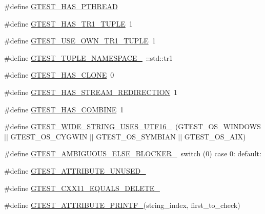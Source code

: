 \begin{DoxyCompactItemize}
\item 
\#define \mbox{\hyperlink{gtest-port_8h_a3341397e1952de0b9cd88762d4d3ae4b}{G\+T\+E\+S\+T\+\_\+\+H\+A\+S\+\_\+\+P\+T\+H\+R\+E\+AD}}
\item 
\#define \mbox{\hyperlink{gtest-port_8h_a6de49dd4cbae1db15dc6edca3b179d1b}{G\+T\+E\+S\+T\+\_\+\+H\+A\+S\+\_\+\+T\+R1\+\_\+\+T\+U\+P\+LE}}~1
\item 
\#define \mbox{\hyperlink{gtest-port_8h_afa144e5f5d039db0df873e7ad48c1fda}{G\+T\+E\+S\+T\+\_\+\+U\+S\+E\+\_\+\+O\+W\+N\+\_\+\+T\+R1\+\_\+\+T\+U\+P\+LE}}~1
\item 
\#define \mbox{\hyperlink{gtest-port_8h_a2023f59bfbd8fb7148262a63bdbf0b01}{G\+T\+E\+S\+T\+\_\+\+T\+U\+P\+L\+E\+\_\+\+N\+A\+M\+E\+S\+P\+A\+C\+E\+\_\+}}~\+::std\+::tr1
\item 
\#define \mbox{\hyperlink{gtest-port_8h_a40c075a7f969a694e59532356be59fd5}{G\+T\+E\+S\+T\+\_\+\+H\+A\+S\+\_\+\+C\+L\+O\+NE}}~0
\item 
\#define \mbox{\hyperlink{gtest-port_8h_add695166eb7b691f93777525d5881062}{G\+T\+E\+S\+T\+\_\+\+H\+A\+S\+\_\+\+S\+T\+R\+E\+A\+M\+\_\+\+R\+E\+D\+I\+R\+E\+C\+T\+I\+ON}}~1
\item 
\#define \mbox{\hyperlink{gtest-port_8h_a91a068d3bf6855b6f399f01836ae1482}{G\+T\+E\+S\+T\+\_\+\+H\+A\+S\+\_\+\+C\+O\+M\+B\+I\+NE}}~1
\item 
\#define \mbox{\hyperlink{gtest-port_8h_a0e3904ca8d62334ab5f29c057dceb6a1}{G\+T\+E\+S\+T\+\_\+\+W\+I\+D\+E\+\_\+\+S\+T\+R\+I\+N\+G\+\_\+\+U\+S\+E\+S\+\_\+\+U\+T\+F16\+\_\+}}~(G\+T\+E\+S\+T\+\_\+\+O\+S\+\_\+\+W\+I\+N\+D\+O\+WS $\vert$$\vert$ G\+T\+E\+S\+T\+\_\+\+O\+S\+\_\+\+C\+Y\+G\+W\+IN $\vert$$\vert$ G\+T\+E\+S\+T\+\_\+\+O\+S\+\_\+\+S\+Y\+M\+B\+I\+AN $\vert$$\vert$ G\+T\+E\+S\+T\+\_\+\+O\+S\+\_\+\+A\+IX)
\item 
\#define \mbox{\hyperlink{gtest-port_8h_a00b3684a621ce1422b55a0e7e8a6aecb}{G\+T\+E\+S\+T\+\_\+\+A\+M\+B\+I\+G\+U\+O\+U\+S\+\_\+\+E\+L\+S\+E\+\_\+\+B\+L\+O\+C\+K\+E\+R\+\_\+}}~switch (0) case 0\+: default\+:
\item 
\#define \mbox{\hyperlink{gtest-port_8h_a01f3b31960fc7c4c7ee4b398a914f89a}{G\+T\+E\+S\+T\+\_\+\+A\+T\+T\+R\+I\+B\+U\+T\+E\+\_\+\+U\+N\+U\+S\+E\+D\+\_\+}}
\item 
\#define \mbox{\hyperlink{gtest-port_8h_ab229f1a8ec704ba6a97918f9239547c4}{G\+T\+E\+S\+T\+\_\+\+C\+X\+X11\+\_\+\+E\+Q\+U\+A\+L\+S\+\_\+\+D\+E\+L\+E\+T\+E\+\_\+}}
\item 
\#define \mbox{\hyperlink{gtest-port_8h_ae29b00ca46783509cc900cd03d61ef37}{G\+T\+E\+S\+T\+\_\+\+A\+T\+T\+R\+I\+B\+U\+T\+E\+\_\+\+P\+R\+I\+N\+T\+F\+\_\+}}(string\+\_\+index,  first\+\_\+to\+\_\+check)
$$
\end{DoxyCompactItemize}
